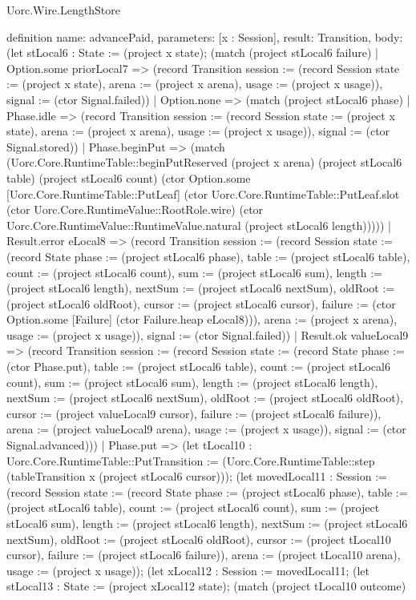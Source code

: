 \begin{lexlean}{Uorc.Wire.LengthStore}
\begin{semanticmodule}
definition{
  name: advancePaid,
  parameters: [x : Session],
  result: Transition,
  body: (let stLocal6 : State := (project x state); (match (project stLocal6 failure)
    | Option.some priorLocal7 => (record Transition {session := (record Session {state := (project x state), arena := (project x arena), usage := (project x usage)}), signal := (ctor Signal.failed)})
    | Option.none => (match (project stLocal6 phase)
      | Phase.idle => (record Transition {session := (record Session {state := (project x state), arena := (project x arena), usage := (project x usage)}), signal := (ctor Signal.stored)})
      | Phase.beginPut => (match (Uorc.Core.RuntimeTable::beginPutReserved (project x arena) (project stLocal6 table) (project stLocal6 count) (ctor Option.some [Uorc.Core.RuntimeTable::PutLeaf] (ctor Uorc.Core.RuntimeTable::PutLeaf.slot (ctor Uorc.Core.RuntimeValue::RootRole.wire) (ctor Uorc.Core.RuntimeValue::RuntimeValue.natural (project stLocal6 length)))))
        | Result.error eLocal8 => (record Transition {session := (record Session {state := (record State {phase := (project stLocal6 phase), table := (project stLocal6 table), count := (project stLocal6 count), sum := (project stLocal6 sum), length := (project stLocal6 length), nextSum := (project stLocal6 nextSum), oldRoot := (project stLocal6 oldRoot), cursor := (project stLocal6 cursor), failure := (ctor Option.some [Failure] (ctor Failure.heap eLocal8))}), arena := (project x arena), usage := (project x usage)}), signal := (ctor Signal.failed)})
        | Result.ok valueLocal9 => (record Transition {session := (record Session {state := (record State {phase := (ctor Phase.put), table := (project stLocal6 table), count := (project stLocal6 count), sum := (project stLocal6 sum), length := (project stLocal6 length), nextSum := (project stLocal6 nextSum), oldRoot := (project stLocal6 oldRoot), cursor := (project valueLocal9 cursor), failure := (project stLocal6 failure)}), arena := (project valueLocal9 arena), usage := (project x usage)}), signal := (ctor Signal.advanced)}))
      | Phase.put => (let tLocal10 : Uorc.Core.RuntimeTable::PutTransition := (Uorc.Core.RuntimeTable::step (tableTransition x (project stLocal6 cursor))); (let movedLocal11 : Session := (record Session {state := (record State {phase := (project stLocal6 phase), table := (project stLocal6 table), count := (project stLocal6 count), sum := (project stLocal6 sum), length := (project stLocal6 length), nextSum := (project stLocal6 nextSum), oldRoot := (project stLocal6 oldRoot), cursor := (project tLocal10 cursor), failure := (project stLocal6 failure)}), arena := (project tLocal10 arena), usage := (project x usage)}); (let xLocal12 : Session := movedLocal11; (let stLocal13 : State := (project xLocal12 state); (match (project tLocal10 outcome)
}
\end{semanticmodule}
\end{lexlean}
